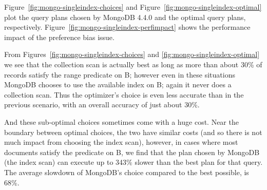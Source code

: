 

Figure~\ref{fig:mongo-singleindex-choices} and Figure~\ref{fig:mongo-singleindex-optimal} plot the query plans chosen by MongoDB 4.4.0 and the optimal query plans, respectively. Figure~\ref{fig:mongo-singleindex-perfimpact} shows the performance impact of the preference bias issue. 


From Figures~\ref{fig:mongo-singleindex-choices} and \ref{fig:mongo-singleindex-optimal} we see that the collection scan is actually best as long as more than about 30\% of records satisfy the range predicate on B; however even in these situations MongoDB chooses to use the available index on B; again it never does a collection scan. Thus the optimizer's choice is even less accurate than in the previous scenario, with an overall accuracy of just about 30\%. %

And these sub-optimal choices sometimes come with a huge cost. Near the boundary between optimal choices, the two have similar costs (and so there is not much impact from choosing the index scan), however, in cases where most documents satisfy the predicate on B, we find that the plan chosen by MongoDB (the index scan) can execute up to 343\% slower than the best plan for that query. The average slowdown of  MongoDB's choice compared to the best possible, is 68\%.


